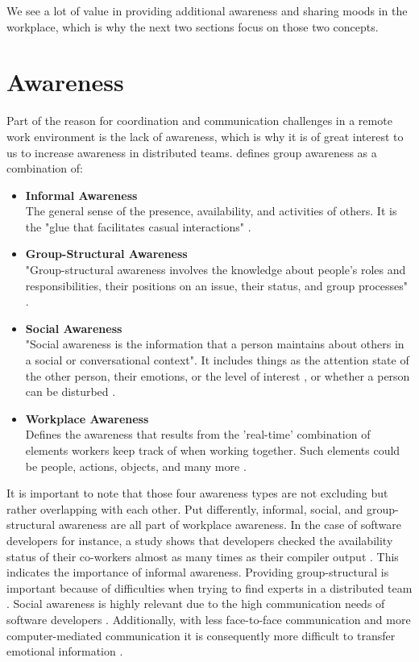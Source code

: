 We see a lot of value in providing additional awareness and sharing moods in the workplace, which is why the next two sections focus on those two concepts.

\section{Awareness}
Part of the reason for coordination and communication challenges in a remote work environment is the lack of awareness, which is why it is of great interest to us to increase awareness in distributed teams. \textcite{gutwin1996workspace} defines group awareness as a combination of:

\begin{itemize}[itemsep=0ex, parsep=0ex, leftmargin=*]
      \item \textbf{Informal Awareness} \\
            The general sense of the presence, availability, and activities of others. It is the "glue that facilitates casual interactions" \autocite{gutwin1996workspace}.
      \item \textbf{Group-Structural Awareness} \\
            "Group-structural awareness involves the knowledge about people’s
            roles and responsibilities, their positions on an issue, their status, and group processes" \autocite{gutwin1996workspace}.
      \item \textbf{Social Awareness} \\
            "Social awareness is the information that a person maintains about others in a social or conversational context"\autocite{gutwin1996workspace}. It includes things as the attention state of the other person, their emotions, or the level of interest \autocite{gutwin1996workspace}, or whether a person can be disturbed \autocite{gutwin1995support}.
      \item \textbf{Workplace Awareness} \\
            Defines the awareness that results from the 'real-time' combination of elements workers keep track of when working together. Such elements could be people, actions, objects, and many more \autocite{gutwin1995support}.
\end{itemize}

It is important to note that those four awareness types are not excluding but rather overlapping with each other. Put differently, informal, social, and group-structural awareness are all part of workplace awareness. In the case of software developers for instance, a study shows that developers checked the availability status of their co-workers almost as many times as their compiler output \autocite{ko2007information}. This indicates the importance of informal awareness. Providing group-structural is important because of difficulties when trying to find experts in a distributed team \autocite{herbsleb2003empirical}. Social awareness is highly relevant due to the high communication needs of software developers \autocite{perry1994people}. Additionally, with less face-to-face communication and more computer-mediated communication it is consequently more difficult to transfer emotional information \autocite{rivera1996effects}.


